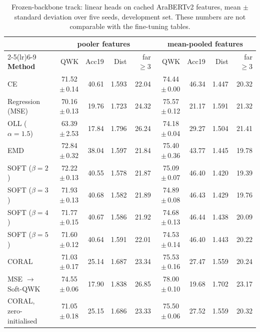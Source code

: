 \begin{table}[H]
\centering
\footnotesize
\caption{Frozen-backbone track: linear heads on cached AraBERTv2 features, mean $\pm$ standard deviation over five seeds, development set. These numbers are not comparable with the fine-tuning tables.}
\label{tab:res-cpu}
\begin{tabular}{lrrrrrrrr}
\toprule
& \multicolumn{4}{c}{\textbf{pooler features}} & \multicolumn{4}{c}{\textbf{mean-pooled features}} \\
\cmidrule(lr){2-5}\cmidrule(lr){6-9}
\textbf{Method} & QWK & Acc19 & Dist & far$\geq$3 & QWK & Acc19 & Dist & far$\geq$3 \\
\midrule
CE & 71.52\,$\pm$\,0.14 & 40.61 & 1.593 & 22.04 & 74.44\,$\pm$\,0.00 & 46.34 & 1.447 & 20.32 \\
Regression (MSE) & 70.16\,$\pm$\,0.13 & 19.76 & 1.723 & 24.32 & 75.57\,$\pm$\,0.12 & 21.17 & 1.591 & 21.32 \\
OLL ($\alpha=1.5$) & 63.39\,$\pm$\,2.53 & 17.84 & 1.796 & 26.24 & 74.18\,$\pm$\,0.04 & 29.27 & 1.504 & 21.41 \\
EMD & 72.84\,$\pm$\,0.32 & 38.04 & 1.597 & 21.84 & 75.40\,$\pm$\,0.36 & 43.77 & 1.445 & 19.78 \\
SOFT ($\beta=2$) & 72.22\,$\pm$\,0.13 & 40.55 & 1.578 & 21.87 & 75.09\,$\pm$\,0.07 & 46.40 & 1.420 & 19.39 \\
SOFT ($\beta=3$) & 71.93\,$\pm$\,0.13 & 40.68 & 1.582 & 21.89 & 74.89\,$\pm$\,0.08 & 46.43 & 1.429 & 19.76 \\
SOFT ($\beta=4$) & 71.77\,$\pm$\,0.15 & 40.67 & 1.586 & 21.92 & 74.68\,$\pm$\,0.13 & 46.44 & 1.438 & 20.09 \\
SOFT ($\beta=5$) & 71.60\,$\pm$\,0.12 & 40.64 & 1.591 & 22.01 & 74.53\,$\pm$\,0.14 & 46.40 & 1.443 & 20.22 \\
CORAL & 71.03\,$\pm$\,0.17 & 25.14 & 1.687 & 23.34 & 75.53\,$\pm$\,0.16 & 27.47 & 1.559 & 20.24 \\
\midrule
MSE $\rightarrow$ Soft-QWK & 74.55\,$\pm$\,0.06 & 17.90 & 1.838 & 26.85 & 78.00\,$\pm$\,0.10 & 19.68 & 1.702 & 23.17 \\
\midrule
CORAL, zero-initialised & 71.05\,$\pm$\,0.18 & 25.15 & 1.686 & 23.33 & 75.50\,$\pm$\,0.06 & 27.52 & 1.559 & 20.32 \\
\bottomrule
\end{tabular}
\end{table}
